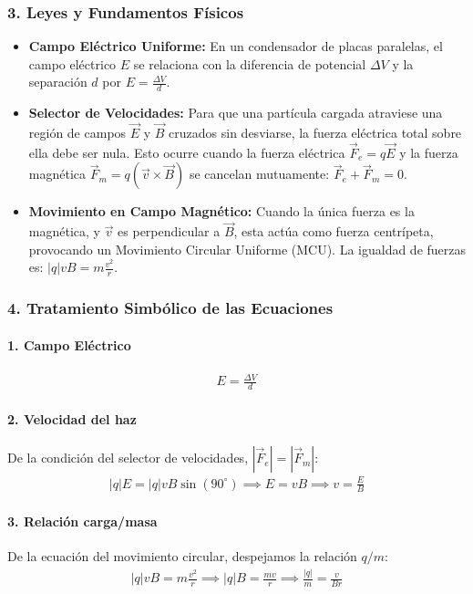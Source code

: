 \subsubsection*{3. Leyes y Fundamentos Físicos}
\begin{itemize}
    \item \textbf{Campo Eléctrico Uniforme:} En un condensador de placas paralelas, el campo eléctrico $E$ se relaciona con la diferencia de potencial $\Delta V$ y la separación $d$ por $E = \frac{\Delta V}{d}$.
    \item \textbf{Selector de Velocidades:} Para que una partícula cargada atraviese una región de campos $\vec{E}$ y $\vec{B}$ cruzados sin desviarse, la fuerza eléctrica total sobre ella debe ser nula. Esto ocurre cuando la fuerza eléctrica $\vec{F}_e = q\vec{E}$ y la fuerza magnética $\vec{F}_m = q(\vec{v} \times \vec{B})$ se cancelan mutuamente: $\vec{F}_e + \vec{F}_m = 0$.
    \item \textbf{Movimiento en Campo Magnético:} Cuando la única fuerza es la magnética, y $\vec{v}$ es perpendicular a $\vec{B}$, esta actúa como fuerza centrípeta, provocando un Movimiento Circular Uniforme (MCU). La igualdad de fuerzas es: $|q|vB = m\frac{v^2}{r}$.
\end{itemize}

\subsubsection*{4. Tratamiento Simbólico de las Ecuaciones}
\paragraph{1. Campo Eléctrico}
\begin{gather}
    E = \frac{\Delta V}{d}
\end{gather}
\paragraph{2. Velocidad del haz}
De la condición del selector de velocidades, $|\vec{F}_e| = |\vec{F}_m|$:
\begin{gather}
    |q|E = |q|vB\sin(90^\circ) \implies E = vB \implies v = \frac{E}{B}
\end{gather}
\paragraph{3. Relación carga/masa}
De la ecuación del movimiento circular, despejamos la relación $q/m$:
\begin{gather}
    |q|vB = m\frac{v^2}{r} \implies |q|B = \frac{mv}{r} \implies \frac{|q|}{m} = \frac{v}{Br}
\end{gather}

